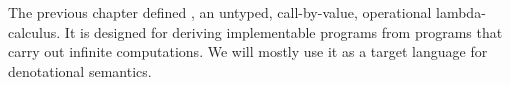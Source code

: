 
\begin{comment}
To this end, we are concurrently developing \targetlang: an untyped, call-by-value lambda calculus extended with sets as values, and primitive set operators that correspond with the Zermelo-Fraenkel axioms and Choice. Mixing lambdas and sets has been done in automated theorem proving \cite{cit:paulson-1993-settheory-i,cit:paulson-1995-settheory-ii,cit:gordon-1996-holst}; it is possible to define exact real arithmetic, and easy to express infinite set operations and infinite sums.  For this paper, we assume those operations are already defined.  We freely use syntactic sugar like infix, summation, set comprehensions, and pattern-matching definitions. In short, we intend \targetlang to be contemporary mathematics with well-defined lambdas, or a practical lambda calculus with infinite sets.

For example, $image$ is a \texttt{map}-like primitive set operator corresponding to the replacement axiom schema. If $f$ is a lambda and $A$ is a set, $\appp \image f A\ =\ \setb{\app f x}{x \in A}$ applies $f$ to every element of $A$ and returns the set of results.

Besides lambdas, \targetlang has an another class of applicable values: set-theoretic functions, or \keyword{mappings}. A mapping is just a set of pairs $\seq{x,y}$ where each $x$ is unique. If $g$ is a mapping and $x$ is in its domain, $\app g x$ returns the $y$ for which $\seq{x,y} \in g$. Restricting a lambda $f$ to a domain $A$ returns a mapping:
\begin{equation}
	{f}\restrict{A}
		\ =\ \setb{\seq{x,\app f x}}{x \in A}
		\ =\ \appp \image {(\fun x {\seq{x,\app f x}})} A
\label{eqn:restrict}
\end{equation}
Mappings can also be restricted using \eqref{eqn:restrict}. We often write mappings as $\fun{x \in A} e$ instead of ${(\fun x e)}\restrict{A}$. We think of $\seq{A, f}$ as a \textit{lazy} mapping.

Though \targetlang has no formal type system, we find it helpful to reason about types informally. When we do, $A \tto B$ is a lambda or mapping type, $A \to B$ is the set of total mappings from $A$ to $B$, and a set is a membership proposition.
\end{comment}

The previous chapter defined \lzfclang, an untyped, call-by-value, operational lambda-calculus.
It is designed for deriving implementable programs from programs that carry out infinite computations.
We will mostly use it as a target language for denotational semantics.

